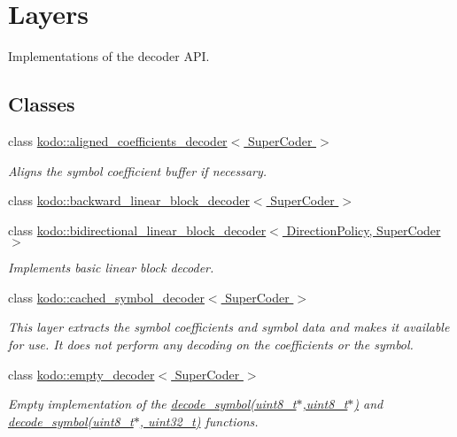 \hypertarget{group__decoder__layers}{\section{Layers}
\label{group__decoder__layers}
}


Implementations of the decoder A\-P\-I.  


\subsection*{Classes}
\begin{DoxyCompactItemize}
\item 
class \hyperlink{classkodo_1_1aligned__coefficients__decoder}{kodo\-::aligned\-\_\-coefficients\-\_\-decoder$<$ Super\-Coder $>$}
\begin{DoxyCompactList}\small\item\em Aligns the symbol coefficient buffer if necessary. \end{DoxyCompactList}\item 
class \hyperlink{classkodo_1_1backward__linear__block__decoder}{kodo\-::backward\-\_\-linear\-\_\-block\-\_\-decoder$<$ Super\-Coder $>$}
\item 
class \hyperlink{classkodo_1_1bidirectional__linear__block__decoder}{kodo\-::bidirectional\-\_\-linear\-\_\-block\-\_\-decoder$<$ Direction\-Policy, Super\-Coder $>$}
\begin{DoxyCompactList}\small\item\em Implements basic linear block decoder. \end{DoxyCompactList}\item 
class \hyperlink{classkodo_1_1cached__symbol__decoder}{kodo\-::cached\-\_\-symbol\-\_\-decoder$<$ Super\-Coder $>$}
\begin{DoxyCompactList}\small\item\em This layer extracts the symbol coefficients and symbol data and makes it available for use. It does not perform any decoding on the coefficients or the symbol. \end{DoxyCompactList}\item 
class \hyperlink{classkodo_1_1empty__decoder}{kodo\-::empty\-\_\-decoder$<$ Super\-Coder $>$}
\begin{DoxyCompactList}\small\item\em Empty implementation of the \hyperlink{classkodo_1_1empty__decoder_aa700bffb25d17e3e2c819d36ed61308a}{decode\-\_\-symbol(uint8\-\_\-t$\ast$,uint8\-\_\-t$\ast$)} and \hyperlink{classkodo_1_1empty__decoder_aac8f8c663ddeaf9700d1a0fc50674462}{decode\-\_\-symbol(uint8\-\_\-t$\ast$, uint32\-\_\-t)} functions. \end{DoxyCompactList}\item 

\end{DoxyCompactItemize}
